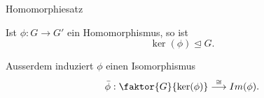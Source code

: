 \documentclass[class=article, crop=false]{standalone}
\begin{document}
\begin{zettel}{Homomorphiesatz}
\begin{flashcard}
    Ist $\phi : G \longrightarrow  G'$ ein Homomorphismus, so ist \[
        \ker (\phi ) \trianglelefteq G
    .\]

    Ausserdem induziert $\phi $  einen Isomorphismus
    \[
        \bar{\phi } : \faktor{G}{ \ker (\phi )} \stackrel{\cong}{\longrightarrow} Im(\phi )
    .\]
\end{flashcard}
\end{zettel}
\end{document}
